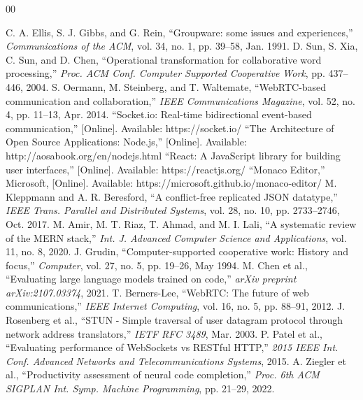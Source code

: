 \documentclass[conference]{IEEEtran}
\begin{document}
\begin{thebibliography}{00}

 C. A. Ellis, S. J. Gibbs, and G. Rein, ``Groupware: some issues and experiences,'' \textit{Communications of the ACM}, vol. 34, no. 1, pp. 39--58, Jan. 1991.
 D. Sun, S. Xia, C. Sun, and D. Chen, ``Operational transformation for collaborative word processing,'' \textit{Proc. ACM Conf. Computer Supported Cooperative Work}, pp. 437--446, 2004.
 S. Oermann, M. Steinberg, and T. Waltemate, ``WebRTC-based communication and collaboration,'' \textit{IEEE Communications Magazine}, vol. 52, no. 4, pp. 11--13, Apr. 2014.
 ``Socket.io: Real-time bidirectional event-based communication,'' [Online]. Available: https://socket.io/
 ``The Architecture of Open Source Applications: Node.js,'' [Online]. Available: http://aosabook.org/en/nodejs.html
 ``React: A JavaScript library for building user interfaces,'' [Online]. Available: https://reactjs.org/
 ``Monaco Editor,'' Microsoft, [Online]. Available: https://microsoft.github.io/monaco-editor/
 M. Kleppmann and A. R. Beresford, ``A conflict-free replicated JSON datatype,'' \textit{IEEE Trans. Parallel and Distributed Systems}, vol. 28, no. 10, pp. 2733--2746, Oct. 2017.
 M. Amir, M. T. Riaz, T. Ahmad, and M. I. Lali, ``A systematic review of the MERN stack,'' \textit{Int. J. Advanced Computer Science and Applications}, vol. 11, no. 8, 2020.
 J. Grudin, ``Computer-supported cooperative work: History and focus,'' \textit{Computer}, vol. 27, no. 5, pp. 19--26, May 1994.
 M. Chen et al., ``Evaluating large language models trained on code,'' \textit{arXiv preprint arXiv:2107.03374}, 2021.
 T. Berners-Lee, ``WebRTC: The future of web communications,'' \textit{IEEE Internet Computing}, vol. 16, no. 5, pp. 88--91, 2012.
 J. Rosenberg et al., ``STUN - Simple traversal of user datagram protocol through network address translators,'' \textit{IETF RFC 3489}, Mar. 2003.
 P. Patel et al., ``Evaluating performance of WebSockets vs RESTful HTTP,'' \textit{2015 IEEE Int. Conf. Advanced Networks and Telecommunications Systems}, 2015.
 A. Ziegler et al., ``Productivity assessment of neural code completion,'' \textit{Proc. 6th ACM SIGPLAN Int. Symp. Machine Programming}, pp. 21--29, 2022.

\end{thebibliography}
\end{document}
